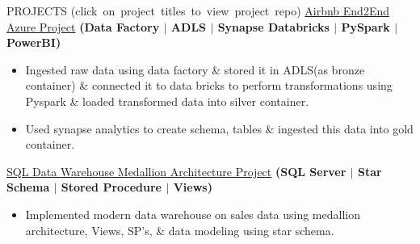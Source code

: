 \documentclass{resume} %
\begin{document}
\begin{rSection}{PROJECTS \MakeLowercase{\normalfont\mbox{(Click on project titles to view project repo)}}}
{\href{https://github.com/lavanchukka/Airbnb-Azure-End2End-Project}{Airbnb End2End Azure Project}} \textbf{\footnotesize{(Data Factory $|$ ADLS $|$ Synapse Databricks $|$ PySpark $|$ PowerBI)}}
\vspace{-3pt}
\begin{itemize}
\itemsep -2pt {}
\item Ingested raw data using data factory \& stored it in ADLS(as bronze container) \& connected it to data bricks to perform transformations using Pyspark \& loaded transformed data into silver container.
\item Used synapse analytics to create schema, tables \& ingested this data into gold container.

\end{itemize}

{\href{https://github.com/lavanchukka/SQL-Data-Warehouse-Medallion-Project}{SQL Data Warehouse Medallion Architecture Project}} \textbf{\footnotesize{(SQL Server $|$ Star Schema $|$ Stored Procedure $|$ Views)}}
\vspace{-3pt}
\begin{itemize}
\itemsep -2pt {}
\item Implemented modern data warehouse on sales data using medallion architecture, Views, SP's, \& data modeling using star schema.
\end{itemize}


\end{rSection}



\end{document}
